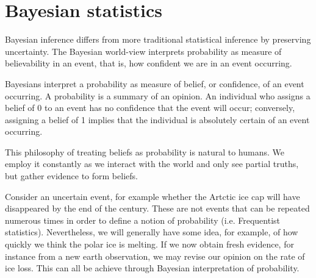 \documentclass[11pt,a4paper]{report}
\begin{document}
\section*{Bayesian statistics}

Bayesian inference differs from more traditional statistical inference
by preserving uncertainty. The Bayesian world-view interprets
probability as measure of believability in an event, that is, how
confident we are in an event occurring.

Bayesians interpret a probability as measure of belief, or confidence,
of an event occurring. A probability is a summary of an opinion. An
individual who assigns a belief of 0 to an event has no confidence
that the event will occur; conversely, assigning a belief of 1 implies
that the individual is absolutely certain of an event occurring.

This philosophy of treating beliefs as probability is natural to
humans. We employ it constantly as we interact with the world and only
see partial truths, but gather evidence to form beliefs.

Consider an uncertain event, for example whether the Artctic ice cap
will have disappeared by the end of the century. These are not events
that can be repeated numerous times in order to define a notion of
probability (i.e. Frequentist statistics). Nevertheless, we will
generally have some idea, for example, of how quickly we think the
polar ice is melting. If we now obtain fresh evidence, for instance
from a new earth observation, we may revise our opinion on the rate of
ice loss. This can all be achieve through Bayesian interpretation of
probability.
\end{document}
